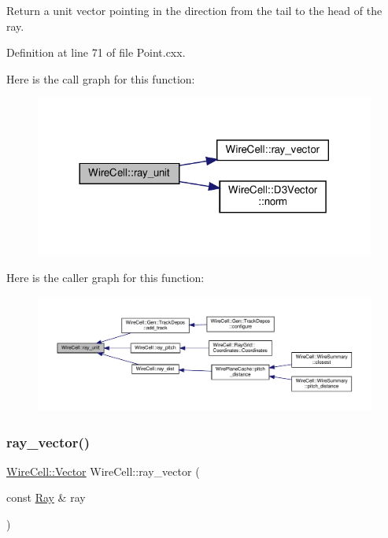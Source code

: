 Return a unit vector pointing in the direction from the tail to the head of the ray. 

Definition at line 71 of file Point.\+cxx.

Here is the call graph for this function\+:
\nopagebreak
\begin{figure}[H]
\begin{center}
\leavevmode
\includegraphics[width=317pt]{namespace_wire_cell_a15976410f167da6dd279a8facf3218df_cgraph}
\end{center}
\end{figure}
Here is the caller graph for this function\+:
\nopagebreak
\begin{figure}[H]
\begin{center}
\leavevmode
\includegraphics[width=350pt]{namespace_wire_cell_a15976410f167da6dd279a8facf3218df_icgraph}
\end{center}
\end{figure}
\mbox{\label{namespace_wire_cell_a3e825e090f86eed7647960e8e611a144}} 
\subsubsection{\texorpdfstring{ray\+\_\+vector()}{ray\_vector()}}
{\footnotesize\ttfamily \hyperlink{namespace_wire_cell_aa3c82d3ba85f032b0d278b7004846800}{Wire\+Cell\+::\+Vector} Wire\+Cell\+::ray\+\_\+vector (\begin{DoxyParamCaption}\item[{const \hyperlink{namespace_wire_cell_a3ab20d9b438feb7eb1ffaab9ba98af0c}{Ray} \&}]{ray }\end{DoxyParamCaption})}

